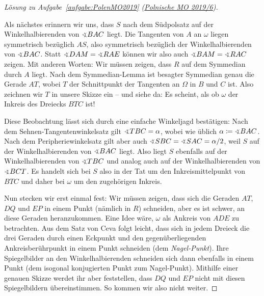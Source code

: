 \begin{proof}[Lösung zu Aufgabe~\ref{aufgabe:PolenMO2019} \textmd{(\href{https://artofproblemsolving.com/community/c904216_2019_polish_mo_finals}{Polnische MO 2019/6})}]
\begin{figure}[ht]
	\end{figure}
	
	Als nächstes erinnern wir uns, dass $S$ nach dem Südpolsatz auf der Winkelhalbierenden von $\winkel BAC$ liegt. Die Tangenten von $A$ an $\omega$ liegen symmetrisch bezüglich $AS$, also symmetrisch bezüglich der Winkelhalbierenden von $\winkel BAC$. Statt $\winkel DAM=\winkel RAE$ können wir also auch $\winkel BAM=\winkel RAC$ zeigen. Mit anderen Worten: Wir müssen zeigen, dass $R$ auf dem Symmedian durch $A$ liegt. Nach dem Symmedian-Lemma ist besagter Symmedian genau die Gerade $AT$, wobei $T$ der Schnittpunkt der Tangenten an $\Omega$ in $B$ und $C$ ist. Also zeichnen wir $T$ in unsere Skizze ein -- und siehe da: Es scheint, als ob $\omega$ der Inkreis des Dreiecks $BTC$ ist!
	
	Diese Beobachtung lässt sich durch eine einfache Winkeljagd bestätigen: Nach dem Sehnen-Tangentenwinkelsatz gilt $\winkel TBC=\alpha$, wobei wie üblich $\alpha\coloneqq \winkel BAC$. Nach dem Peripheriewinkelsatz gilt aber auch $\winkel SBC=\winkel SAC=\alpha/2$, weil $S$ auf der Winkelhalbierenden von $\winkel BAC$ liegt. Also liegt $S$ ebenfalls auf der Winkelhalbierenden von $\winkel TBC$ und analog auch auf der Winkelhalbierenden von $\winkel BCT$. Es handelt sich bei $S$ also in der Tat um den Inkreismittelpunkt von $BTC$ und daher bei $\omega$ um den zugehörigen Inkreis.
	
	Nun stecken wir erst einmal fest: Wir müssen zeigen, dass sich die Geraden $AT$, $DQ$ und $EP$ in einem Punkt (nämlich in $R$) schneiden, aber es ist schwer, an diese Geraden heranzukommen. Eine Idee wäre, $\omega$ als Ankreis von $ADE$ zu betrachten. Aus dem Satz von Ceva folgt leicht, dass sich in jedem Dreieck die drei Geraden durch einen Eckpunkt und den gegenüberliegenden Ankreisberührpunkt in einem Punkt schneiden (dem \emph{Nagel-Punkt}). Ihre Spiegelbilder an den Winkelhalbierenden schneiden sich dann ebenfalls in einem Punkt (dem isogonal konjugierten Punkt zum Nagel-Punkt). Mithilfe einer genauen Skizze werdet ihr aber feststellen, dass $DQ$ und $EP$ nicht mit diesen Spiegelbildern übereinstimmen. So kommen wir also nicht weiter.
	

\end{proof}
